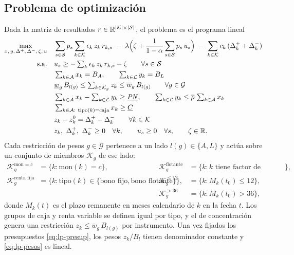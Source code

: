 \subsection{Problema de optimización}
Dada la matriz de resultados $r \in \mathbb{R}^{|\mathcal{K}| \times |\mathcal{S}|}$, el problema es el programa
lineal
\begin{align}
  \max_{x,\,y,\,\Delta^{+},\,\Delta^{-},\,\zeta,\,u}\quad
    & \sum_{s \in \mathcal{S}} p_s \sum_{k \in \mathcal{K}} \epsilon_k\, z_k\, r_{k,s}
      \;-\; \lambda\Big(\zeta + \frac{1}{1-\alpha}\sum_{s \in \mathcal{S}} p_s\, u_s\Big)
      \;-\; \sum_{k \in \mathcal{K}} c_k\,(\Delta_k^+ + \Delta_k^-) \label{eq:lp-obj}\\
  \text{s.a.}\quad
    & u_s \ge -\textstyle\sum_{k} \epsilon_k\, z_k\, r_{k,s} - \zeta\qquad \forall s \in \mathcal{S} \label{eq:lp-cola}\\
    & \textstyle\sum_{k \in \mathcal{A}} x_k = B_A,\qquad \sum_{k \in \mathcal{L}} y_k = B_L \label{eq:lp-presup}\\
    & \underline{w}_g\, B_{l(g)} \le \textstyle\sum_{k \in \mathcal{K}_g} z_k \le \overline{w}_g\, B_{l(g)}
\qquad \forall g \in \mathcal{G} \label{eq:lp-pesos}\\
    & \textstyle\sum_{k \in \mathcal{A}} x_k - \sum_{k \in \mathcal{L}} y_k \ge \underline{\mathit{PN}},\qquad
      \sum_{k \in \mathcal{L}} y_k \le \overline{\rho}\,\sum_{k \in \mathcal{A}} x_k \label{eq:lp-pn}\\
    & \textstyle\sum_{k \in \mathcal{A}:\ \text{tipo}(k) = \text{caja}} x_k \ge \underline{C} \label{eq:lp-caja}\\
    & z_k - z_k^0 = \Delta_k^+ - \Delta_k^-\qquad \forall k \in \mathcal{K} \label{eq:lp-reest}\\
    & z_k,\ \Delta_k^+,\ \Delta_k^- \ge 0\quad \forall k,\qquad u_s \ge 0\quad \forall s,\qquad \zeta \in \mathbb{R}.
\end{align}
Cada restricción de pesos $g \in \mathcal{G}$ pertenece a un lado $l(g) \in \{A, L\}$ y actúa sobre un
conjunto de miembros $\mathcal{K}_g$ de ese lado:
\[
\begin{aligned}
  \mathcal{K}_g^{\text{mon} = c} &= \{k : \text{mon}(k) = c\}, &
  \mathcal{K}_g^{\text{flotante}} &= \{k : k \text{ tiene factor de referencia}\},\\
  \mathcal{K}_g^{\text{renta fija}} &= \{k : \text{tipo}(k) \in \{\text{bono fijo}, \text{bono flotante}\}\}, &
  \mathcal{K}_g^{\le 12} &= \{k : M_k(t_0) \le 12\},\\
  & & \mathcal{K}_g^{> 36} &= \{k : M_k(t_0) > 36\},
\end{aligned}
\]
donde $M_k(t)$ es el plazo remanente en meses calendario de $k$ en la fecha $t$. Los grupos de caja y renta
variable se definen igual por tipo, y el de concentración genera una restricción $z_k \le \overline{w}_g\,
B_{l(g)}$ por instrumento. Una vez fijados los presupuestos \eqref{eq:lp-presup}, los pesos
$z_k / B_{l}$ tienen denominador constante y \eqref{eq:lp-pesos} es lineal.

